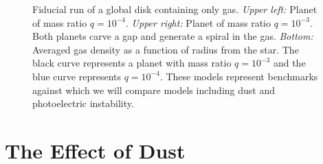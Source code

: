 \documentclass[onecolumn]{report}
\begin{document}
\begin{figure}
  \begin{center}
    \caption{Fiducial run of a global disk containing only
      gas. \textit{Upper left:} Planet of mass ratio
      $q=10^{-4}$. \textit{Upper right:} Planet of mass ratio
      $q=10^{-3}$. Both planets carve a gap and generate a spiral in
      the gas. \textit{Bottom:} Averaged gas density as a function of
      radius from the star. The black curve represents a planet with
      mass ratio $q=10^{-3}$ and the blue curve represents
      $q=10^{-4}$. These models represent benchmarks against which we
      will compare models including dust and photoelectric instability.}
    \label{fig:devalborro}
  \end{center}
\end{figure} 


\section{The Effect of Dust}
\end{document}

